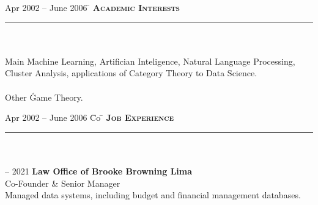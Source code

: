\documentclass[11pt,a4paper]{article}
\begin{document}
\begin{tabbing} 
Apr 2002 -- June 2006 \=\kill
\> \textbf{\Large{\textsc{Academic Interests}}}\\
\> \noindent\rule{11cm}{1pt}\\
\\
\> Main \' Machine Learning, Artifician Inteligence, Natural Language Processing, \\ 
\> Cluster Analysis, applications of Category Theory to Data Science. \\

\\
\> Other \' Game Theory. 
\\
\end{tabbing}

\begin{tabbing}
Apr 2002 -- June 2006 \= Co \=\kill
\> \textbf{\Large{\textsc{Job Experience}}} \\
\> \noindent\rule{11cm}{1pt}\\
\> \\

 -- 2021 \' \textbf{Law Office of Brooke Browning Lima}\\
\> Co-Founder \& Senior Manager \\

\>  Managed data systems, including budget and financial management databases.\\
\\


\end{tabbing}
\end{document}
